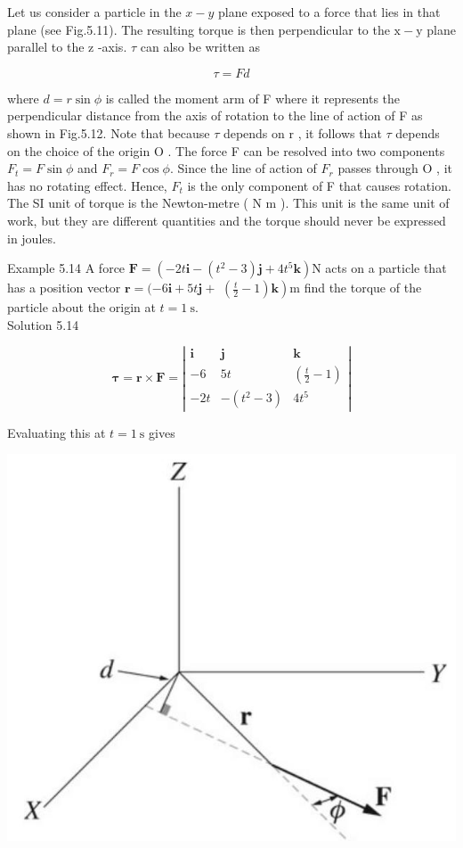 \documentclass[10pt]{article}
\begin{document}
Let us consider a particle in the $x-y$ plane exposed to a force that lies in that plane (see Fig.5.11). The resulting torque is then perpendicular to the $\mathrm{x}-\mathrm{y}$ plane parallel to the z -axis. $\tau$ can also be written as

$$
\tau=F d
$$

where $d=r \sin \phi$ is called the moment arm of F where it represents the perpendicular distance from the axis of rotation to the line of action of F as shown in Fig.5.12. Note that because $\tau$ depends on r , it follows that $\tau$ depends on the choice of the origin O . The force F can be resolved into two components $F_{t}=F \sin \phi$ and $F_{r}=F \cos \phi$. Since the line of action of $F_{r}$ passes through O , it has no rotating effect. Hence, $F_{t}$ is the only component of F that causes rotation. The SI unit of torque is the Newton-metre ( N m ). This unit is the same unit of work, but they are different quantities and the torque should never be expressed in joules.

Example 5.14 A force $\mathbf{F}=\left(-2 t \mathbf{i}-\left(t^{2}-3\right) \mathbf{j}+4 t^{5} \mathbf{k}\right) \mathrm{N}$ acts on a particle that has a position vector $\mathbf{r}=(-6 \mathbf{i}+5 t \mathbf{j}+$ $\left.\left(\frac{t}{2}-1\right) \mathbf{k}\right) \mathrm{m}$ find the torque of the particle about the origin at $t=1 \mathrm{~s}$.\\
Solution 5.14

$$
\boldsymbol{\tau}=\mathbf{r} \times \mathbf{F}=\left|\begin{array}{lll}
\mathbf{i} & \mathbf{j} & \mathbf{k} \\
-6 & 5 t & \left(\frac{t}{2}-1\right) \\
-2 t & -\left(t^{2}-3\right) & 4 t^{5}
\end{array}\right|
$$

Evaluating this at $t=1 \mathrm{~s}$ gives

\begin{center}
\includegraphics[max width=\textwidth]{2024_09_13_db1f357d2aad0a03eb2eg-091}
\end{center}
\end{document}
